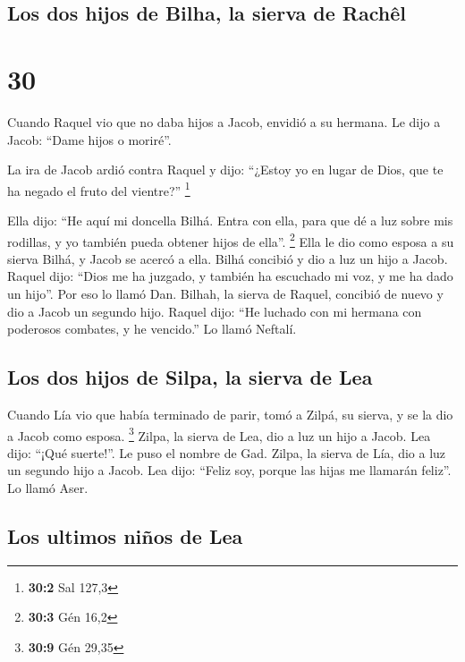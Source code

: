 \hypertarget{los-dos-hijos-de-bilha-la-sierva-de-rachuxeal}{%
\subsection{Los dos hijos de Bilha, la sierva de
Rachêl}\label{los-dos-hijos-de-bilha-la-sierva-de-rachuxeal}}

\hypertarget{section-29}{%
\section{30}\label{section-29}}

 Cuando Raquel vio que no daba hijos a Jacob, envidió a su
hermana. Le dijo a Jacob: ``Dame hijos o moriré''.

 La ira de Jacob ardió contra Raquel y dijo: ``¿Estoy yo
en lugar de Dios, que te ha negado el fruto del vientre?'' \footnote{\textbf{30:2}
  Sal 127,3}

 Ella dijo: ``He aquí mi doncella Bilhá. Entra con ella,
para que dé a luz sobre mis rodillas, y yo también pueda obtener hijos
de ella''. \footnote{\textbf{30:3} Gén 16,2}  Ella le dio
como esposa a su sierva Bilhá, y Jacob se acercó a ella. 
Bilhá concibió y dio a luz un hijo a Jacob.  Raquel dijo:
``Dios me ha juzgado, y también ha escuchado mi voz, y me ha dado un
hijo''. Por eso lo llamó Dan.  Bilhah, la sierva de
Raquel, concibió de nuevo y dio a Jacob un segundo hijo. 
Raquel dijo: ``He luchado con mi hermana con poderosos combates, y he
vencido.'' Lo llamó Neftalí.

\hypertarget{los-dos-hijos-de-silpa-la-sierva-de-lea}{%
\subsection{Los dos hijos de Silpa, la sierva de
Lea}\label{los-dos-hijos-de-silpa-la-sierva-de-lea}}

 Cuando Lía vio que había terminado de parir, tomó a
Zilpá, su sierva, y se la dio a Jacob como esposa. \footnote{\textbf{30:9}
  Gén 29,35}  Zilpa, la sierva de Lea, dio a luz un hijo
a Jacob.  Lea dijo: ``¡Qué suerte!''. Le puso el nombre
de Gad.  Zilpa, la sierva de Lía, dio a luz un segundo
hijo a Jacob.  Lea dijo: ``Feliz soy, porque las hijas me
llamarán feliz''. Lo llamó Aser.

\hypertarget{los-ultimos-niuxf1os-de-lea}{%
\subsection{Los ultimos niños de
Lea}\label{los-ultimos-niuxf1os-de-lea}}

